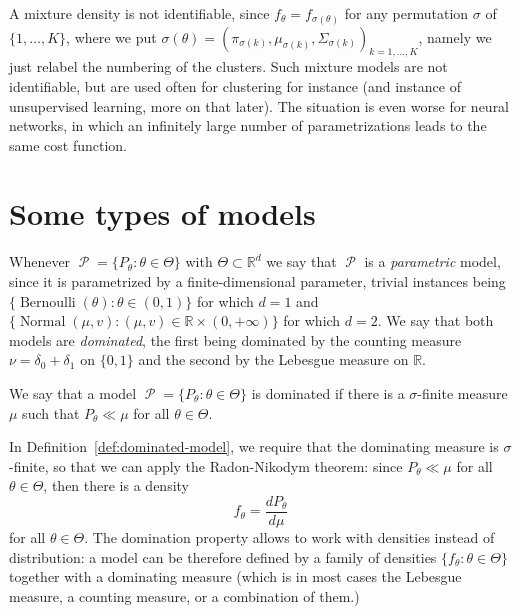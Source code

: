 \documentclass[
	fontsize=11pt, %
	twoside=false, %
	numbers=noenddot, %
]{kaobook}
\DeclareMathOperator{\cP}{\mathcal P}
\DeclareMathOperator{\nor}{Normal}
\DeclareMathOperator{\ber}{Bernoulli}
\newcommand{\R}{\mathbb R}
\begin{document}
A mixture density is not identifiable, since $f_{\theta} = f_{\sigma(\theta)}$
for any permutation $\sigma$ of $\{1, \ldots, K \}$, where we put $\sigma(\theta) = (\pi_{\sigma(k)}, \mu_{\sigma(k)}, \Sigma_{\sigma(k)})_{k=1, \ldots, K}$, namely we just relabel the numbering of the clusters.
Such mixture models are not identifiable, but are used often for clustering for instance (and instance of unsupervised learning, more on that later).
The situation is even worse for neural networks, in which an infinitely large number of parametrizations leads to the same cost function.

\section{Some types of models} %
\label{sec:some_types_of_models}

Whenever $\cP = \{ P_\theta : \theta \in \Theta \}$ with $\Theta \subset \R^d$ we say that $\cP$ is a \emph{parametric} model, since it is parametrized by a finite-dimensional parameter, trivial instances being $\{ \ber(\theta) : \theta \in (0, 1) \}$ for which $d=1$ and $\{ \nor(\mu, v) : (\mu, v) \in \R \times (0, +\infty) \}$ for which $d=2$.
We say that both models are \emph{dominated}, the first being dominated by the counting measure $\nu = \delta_0 + \delta_1$ on $\{ 0, 1\}$ and the second by the Lebesgue measure on $\R$.
\begin{definition}
	\label{def:dominated-model}
	We say that a model $\cP = \{ P_\theta : \theta \in \Theta \}$ is dominated if there is a $\sigma$-finite measure $\mu$ such that $P_\theta \ll \mu$ for all $\theta \in \Theta$.
\end{definition}
In Definition~\ref{def:dominated-model}, we require that the dominating measure is $\sigma$-finite, so that we can apply the Radon-Nikodym theorem: since $P_\theta \ll \mu$ for all $\theta \in \Theta$, then there is a density 
\begin{equation*}
	f_\theta = \frac{dP_\theta}{d\mu}
\end{equation*}
for all $\theta \in \Theta$.
The domination property allows to work with densities instead of distribution: a model can be therefore defined by a family of densities $\{ f_\theta : \theta \in \Theta \}$ together with a dominating measure (which is in most cases the Lebesgue measure, a counting measure, or a combination of them.)
\end{document}
